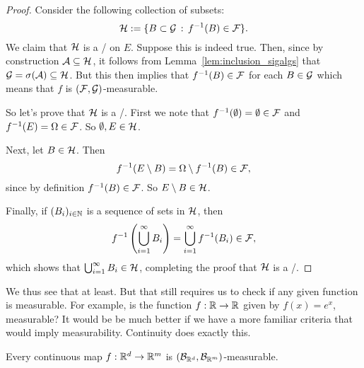 \begin{proof}
Consider the following collection of subsets:
\[
	\mathcal H := \{B \subset \mathcal G \, : \, f^{-1}(B) \in \mathcal F\}.
\]
We claim that $\mathcal H$ is a \sigalg/ on $E$. Suppose this is indeed true. Then, since by construction $\mathcal A \subseteq \mathcal H$, it follows from Lemma~\ref{lem:inclusion_sigalgs} that $\mathcal G = \sigma(\mathcal A) \subseteq \mathcal H$. But this then implies that $f^{-1}(B) \in \mathcal F$ for each $B \in \mathcal G$ which means that $f$ is $(\mathcal F, \mathcal G)$-measurable.

So let's prove that $\mathcal H$ is a \sigalg/. First we note that $f^{-1}(\emptyset) = \emptyset \in \mathcal F$ and $f^{-1}(E) = \Omega \in \mathcal F$. So $\emptyset, E \in \mathcal H$. 

Next, let $B \in \mathcal H$. Then
\[
	f^{-1}(E\setminus B) = \Omega \setminus f^{-1}(B) \in \mathcal F,
\]
since by definition $f^{-1}(B) \in \mathcal F$. So $E\setminus B \in \mathcal H$.

Finally, if $(B_i)_{i \in \mathbb N}$ is a sequence of sets in $\mathcal H$, then
\[
	f^{-1}\left(\bigcup_{i = 1}^\infty B_i\right) = \bigcup_{i = 1}^\infty f^{-1}(B_i) \in \mathcal F,
\]
which shows that $\bigcup_{i = 1}^\infty B_i \in \mathcal H$, completing the proof that $\mathcal H$ is a \sigalg/.
\end{proof}

We thus see that at least. But that still requires us to check if any given function is measurable. For example, is the function $f : \mathbb R \to \mathbb R$ given by $f(x) = e^x$, measurable? It would be be much better if we have a more familiar criteria that would imply measurability. Continuity does exactly this. 

\begin{proposition}
Every continuous map $f : \mathbb R^d \to \mathbb R^m$ is $(\mathcal B_{\mathbb R^d}, \mathcal B_{\mathbb R^m})$-measurable.
\end{proposition}

